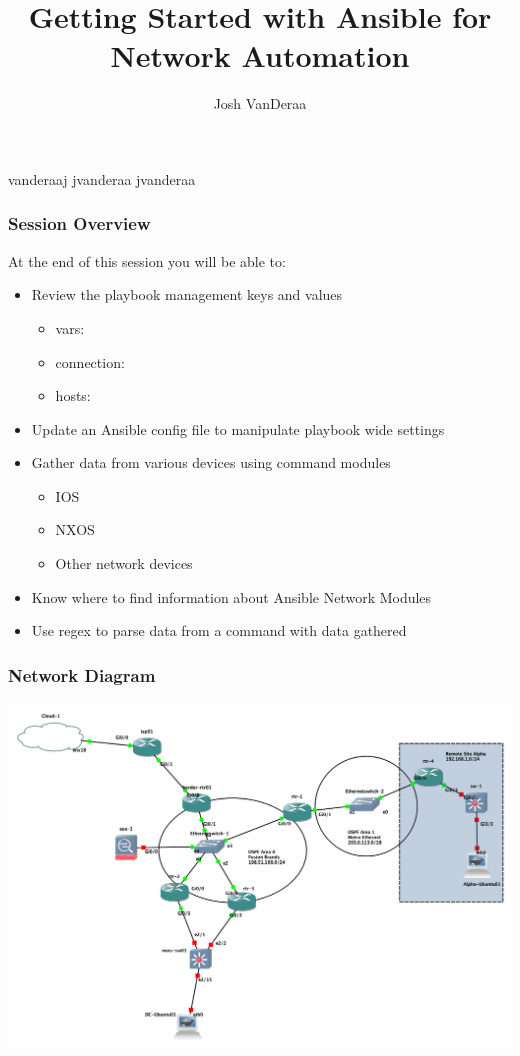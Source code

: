 \documentclass{beamer}
\title{Getting Started with Ansible for Network Automation}
\date{}
\author{Josh VanDeraa}
\begin{document}
\begin{frame}
  \maketitle
  \footnotesize
  \faTwitter vanderaaj \hfill \faGithub jvanderaa \hfill \faSlack jvanderaa
\end{frame}

\begin{frame}
\frametitle{Session Overview}
At the end of this session you will be able to:
\begin{itemize}
  \item <2-> Review the playbook management keys and values
  \begin{itemize}
    \item <3-> vars:
    \item <4-> connection:
    \item <5-> hosts:
  \end{itemize}
  \item <6-> Update an Ansible config file to manipulate playbook wide settings
  \item <7-> Gather data from various devices using command modules
    \begin{itemize}
        \item IOS
        \item NXOS
        \item Other network devices
    \end{itemize}
  \item <8-> Know where to find information about Ansible Network Modules
  \item <9-> Use regex to parse data from a command with data gathered
\end{itemize}
\end{frame}

\begin{frame}
\frametitle{Network Diagram}
\includegraphics[width=\textwidth]{assets/base_setup.png}
\end{frame}
\end{document}
